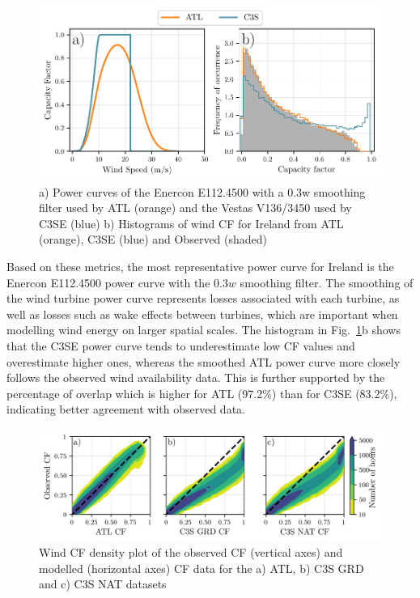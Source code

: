\documentclass[preprint, 12pt]{elsarticle}
\begin{document}
\begin{figure}[!ht]
	\centering
	\includegraphics[width=\textwidth]{verification_power_curve.pdf}
	\caption{a) Power curves of the Enercon E112.4500 with a 0.3w smoothing filter used by ATL (orange) and the Vestas V136/3450 used by C3SE (blue) b) Histograms of wind CF for Ireland from ATL (orange), C3SE (blue) and Observed (shaded)}
	\label{fig:power_curve}
\end{figure}

Based on these metrics, the most representative power curve for Ireland is the Enercon E112.4500 power curve with the $0.3w$ smoothing filter. The smoothing of the wind turbine power curve represents losses associated with each turbine, as well as losses such as wake effects between turbines, which are important when modelling wind energy on larger spatial scales. The histogram in Fig.~\ref{fig:power_curve}b shows that the C3SE power curve tends to underestimate low CF values and overestimate higher ones, whereas the smoothed ATL power curve more closely follows the observed wind availability data. This is further supported by the percentage of overlap which is higher for ATL (97.2\%) than for C3SE (83.2\%), indicating better agreement with observed data.

\begin{figure}[!ht]
	\centering
	\includegraphics[width=\textwidth]{verification_wind_contour.png}
	\caption{Wind CF density plot of the observed CF (vertical axes) and modelled (horizontal axes) CF data for the a) ATL, b) C3S GRD and c) C3S NAT datasets}
	\label{fig:wind_verification_contour}
\end{figure}
\end{document}
